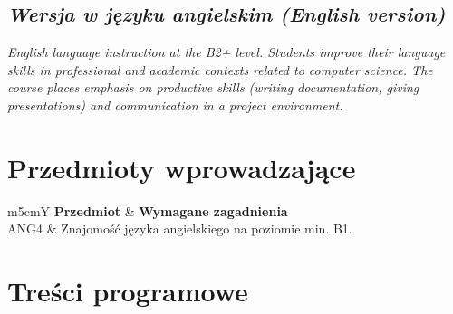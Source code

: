 \documentclass[12pt, a4paper]{article}
\newcommand{\thdrule}{\noalign{\global\setlength{\extrarowheight}{0pt}}}
\newcommand{\thdend}{\noalign{\global\setlength{\extrarowheight}{3pt}}}
\begin{document}
\subsection*{\textit{Wersja w języku angielskim (English version)}}

\textit{English language instruction at the B2+ level. Students improve their language skills in professional and academic contexts related to computer science. The course places emphasis on productive skills (writing documentation, giving presentations) and communication in a project environment.}


\section{Przedmioty wprowadzające}

{\scriptsize
\begin{tabularx}{\textwidth}{m{5cm}Y}
\thdrule\toprule
{} {\color{white}\textbf{Przedmiot}} & {\color{white}\textbf{Wymagane zagadnienia}} \\
\midrule\thdend
   ANG4 & Znajomość języka angielskiego na poziomie min. B1. \\
\bottomrule
\end{tabularx}}

\section{Treści programowe}
\end{document}
